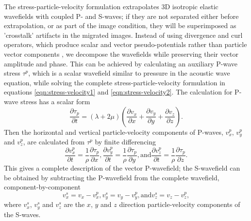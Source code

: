 \documentclass[manuscript,ulem,graphix,revised]{geophysics}
\begin{document}
The stress-particle-velocity formulation extrapolates 3D isotropic elastic wavefields with coupled P- and S-waves; if they are not separated either before extrapolation, or as part of the image condition, they will be superimposed as 'crosstalk' artifacts in the migrated images. Instead of using divergence and curl operators, which produce scalar and vector pseudo-potentials rather than particle vector components \citep{aki80,yan08}, we decompose the wavefields while preserving their vector amplitude and phase. This can be achieved by calculating an auxiliary P-wave stress $\tau^p$, which is a scalar wavefield similar to pressure in the acoustic wave equation, while solving the complete stress-particle-velocity formulation in equations \ref{eqn:stress-velocity1} and \ref{eqn:stress-velocity2}. The calculation for P-wave stress has a scalar form \citep{xiao10} 
\begin{equation}
\frac{\partial\tau_{p}}{\partial t}=(\lambda+2\mu)(\frac{\partial v_x}{\partial x}+\frac{\partial v_y}{\partial y}+\frac{\partial v_z}{\partial z}).
\label{eqn:tau-p}
\end{equation}
Then the horizontal and vertical particle-velocity components of P-waves, $v^p_{x}$, $v^p_{y}$ and $v^p_{z}$, are calculated from $\tau^p$ by finite differencing
\begin{subequations}
\begin{equation}
\frac{\partial v^p_{x}}{\partial t}=\frac{1}{\rho}\frac{\partial\tau _{p}}{\partial x},
\end{equation}
\begin{equation}
\frac{\partial v^p_{y}}{\partial t}=\frac{1}{\rho}\frac{\partial\tau _{p}}{\partial y},
\end{equation}
\text{and}
\begin{equation}
\frac{\partial v^p_{z}}{\partial t}=\frac{1}{\rho}\frac{\partial\tau _{p}}{\partial z}.
\end{equation}
\label{eqn:vp}
\end{subequations}
This gives a complete description of the vector P-wavefield; the S-wavefield can be obtained by subtracting the P-wavefield from the complete wavefield, component-by-component
\begin{subequations}
\begin{equation}
v^s_{x}=v_x-v^p_{x},
\end{equation}
\begin{equation}
v^s_{y}=v_y-v^p_{y},
\end{equation}
\text{and}
\begin{equation}
v^s_{z}=v_z-v^p_{z},
\end{equation}
\label{eqn:vs}
\end{subequations}
where $v^s_x$,  $v^s_y$ and $v^s_z$ are the $x$, $y$ and $z$ direction particle-velocity components of the S-waves. 
\end{document}
